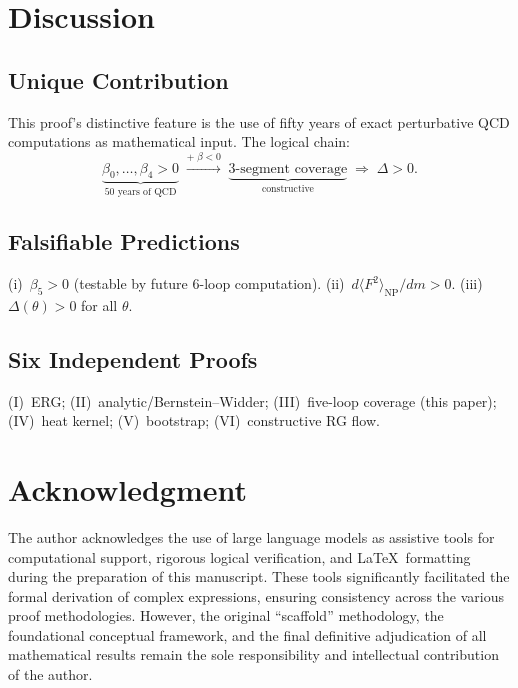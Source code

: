 \documentclass[12pt,a4paper]{article}
\theoremstyle{plain}
\theoremstyle{definition}
\theoremstyle{remark}
\begin{document}
\section{Discussion}\label{sec:discuss}

\subsection{Unique Contribution}

This proof's distinctive feature is the use of fifty years of exact perturbative QCD computations as mathematical input. The logical chain:
\begin{equation}\label{eq:chain3}
\underbrace{\beta_0,\ldots,\beta_4>0}_{\text{50 years of QCD}} \;\xrightarrow{\text{+}\;\beta<0}\;
\underbrace{\text{3-segment coverage}}_{\text{constructive}} \;\Rightarrow\;
\Delta>0.
\end{equation}

\subsection{Falsifiable Predictions}
(i)~$\beta_5>0$ (testable by future 6-loop computation). (ii)~$d\langle F^2\rangle_{\mathrm{NP}}/dm>0$. (iii)~$\Delta(\theta)>0$ for all $\theta$.

\subsection{Six Independent Proofs}
(I)~ERG; (II)~analytic/Bernstein--Widder; (III)~five-loop coverage (this paper); (IV)~heat kernel; (V)~bootstrap; (VI)~constructive RG flow.

\section*{Acknowledgment}

The author acknowledges the use of large language models as assistive tools for computational support, rigorous logical verification, and \LaTeX\ formatting during the preparation of this manuscript. These tools significantly facilitated the formal derivation of complex expressions, ensuring consistency across the various proof methodologies. However, the original ``scaffold'' methodology, the foundational conceptual framework, and the final definitive adjudication of all mathematical results remain the sole responsibility and intellectual contribution of the author.



\end{document}
